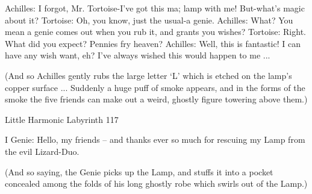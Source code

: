           Achilles: I forgot, Mr. Tortoise-I've got this ma; lamp with me! But-what's
                 magic about it? Tortoise: Oh, you know, just the usual-a genie.
          Achilles: What? You mean a genie comes out when you rub it, and grants you
                 wishes?
          Tortoise: Right. What did you expect? Pennies fry heaven?
          Achilles: Well, this is fantastic! I can have any wish want, eh? I've always
                 wished this would happen to me ...

             (And so Achilles gently rubs the large letter `L' which is etched on the
             lamp's copper surface ... Suddenly a huge puff of smoke appears, and in the
             forms of the smoke the five friends can make out a weird, ghostly figure
             towering above them.)




Little Harmonic Labyrinth                                                              117

            I
          Genie: Hello, my friends – and thanks ever so much for rescuing my Lamp
                 from the evil Lizard-Duo.

             (And so saying, the Genie picks up the Lamp, and stuffs it into a pocket
             concealed among the folds of his long ghostly robe which swirls out of the
             Lamp.)

